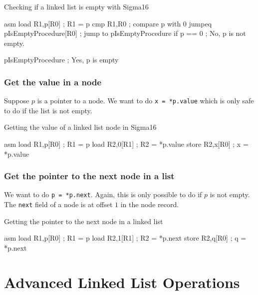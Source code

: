 \begin{highlight}{Checking if a linked list is empty with Sigma16}
    \begin{code}{asm}
        load R1,p[R0] ; R1 = p
        cmp R1,R0 ; compare p with 0
        jumpeq pIsEmptyProcedure[R0] ; jump to pIsEmptyProcedure if p == 0
        ; No, p is not empty.

        pIsEmptyProcedure
        ; Yes, p is empty
    \end{code}
\end{highlight}

\subsubsection{Get the value in a node}\label{ssub:get_the_value_in_a_node}

Suppose \(p\) is a pointer to a node.
We want to do \texttt{x = *p.value} which is only safe to do if the list is not empty.

\begin{highlight}{Getting the value of a linked list node in Sigma16}
    \begin{code}{asm}
        load R1,p[R0] ; R1 = p
        load R2,0[R1] ; R2 = *p.value
        store R2,x[R0] ; x = *p.value
    \end{code}
\end{highlight}

\subsubsection{Get the pointer to the next node in a list}\label{ssub:get_the_pointer_to_the_next_node_in_a_list}

We want to do \texttt{p = *p.next}.
Again, this is only possible to do if \(p\) is not empty.
The \texttt{next} field of a node is at offset \(1\) in the node record.

\begin{highlight}{Getting the pointer to the next node in a linked list}
    \begin{code}{asm}
        load R1,p[R0] ; R1 = p
        load R2,1[R1] ; R2 = *p.next
        store R2,q[R0] ; q = *p.next
    \end{code}
\end{highlight}

\section{Advanced Linked List Operations}\label{sec:advanced_linked_list_operations}


